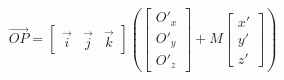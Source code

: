\documentclass{article}
\begin{document}
\thispagestyle{empty}

$$
\overrightarrow{OP} =
\begin{bmatrix}\vec{i} & \vec{j} & \vec{k}\end{bmatrix}\left(
\begin{bmatrix}O'_x \\ O'_y \\ O'_z\end{bmatrix} + 
 M \begin{bmatrix}x' \\ y' \\ z'\end{bmatrix} \right)
$$
\end{document}
